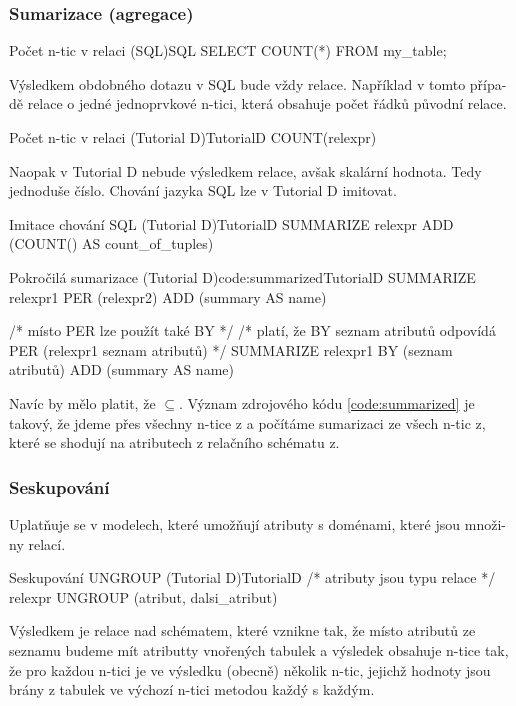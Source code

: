 \subsubsection{Sumarizace (agregace)}
\begin{upcode}{Počet n-tic v relaci (SQL)}{}{SQL}
SELECT COUNT(*) FROM my_table;
\end{upcode}
Výsledkem obdobného dotazu v SQL bude vždy relace. Například v tomto přípa-dě relace o jedné jednoprvkové n-tici, která obsahuje počet řádků původní relace.
\begin{upcode}{Počet n-tic v relaci (Tutorial D)}{}{TutorialD}
COUNT(relexpr)
\end{upcode}
Naopak v Tutorial D nebude výsledkem relace, avšak skalární hodnota. Tedy jednoduše číslo. Chování jazyka SQL lze v Tutorial D imitovat.
\begin{upcode}{Imitace chování SQL (Tutorial D)}{}{TutorialD}
SUMMARIZE relexpr ADD (COUNT() AS count_of_tuples)
\end{upcode}
\begin{upcode}{Pokročilá sumarizace (Tutorial D)}{code:summarized}{TutorialD}
SUMMARIZE relexpr1
PER (relexpr2)
ADD (summary AS name)

/* místo PER lze použít také BY */
/* platí, že BY {seznam atributů} odpovídá PER (relexpr1 {seznam atributů}) */
SUMMARIZE relexpr1
BY (seznam atributů)
ADD (summary AS name)
\end{upcode}
Navíc by mělo platit, že $\subseteq$. Význam zdrojového kódu \ref{code:summarized} je takový, že jdeme přes všechny n-tice z a počítáme sumarizaci ze všech n-tic z, které se shodují na atributech z relačního schématu z.

\subsubsection{Seskupování}
Uplatňuje se v modelech, které umožňují atributy s doménami, které jsou množi-ny relací.

\begin{upcode}{Seskupování UNGROUP (Tutorial D)}{}{TutorialD}
/* atributy jsou typu relace */
relexpr UNGROUP (atribut, dalsi_atribut)
\end{upcode}
Výsledkem je relace nad schématem, které vznikne tak, že místo atributů ze seznamu budeme mít atributty vnořených tabulek a výsledek obsahuje n-tice tak, že pro každou n-tici je ve výsledku (obecně) několik n-tic, jejichž hodnoty jsou brány z tabulek ve výchozí n-tici metodou každý s každým.

